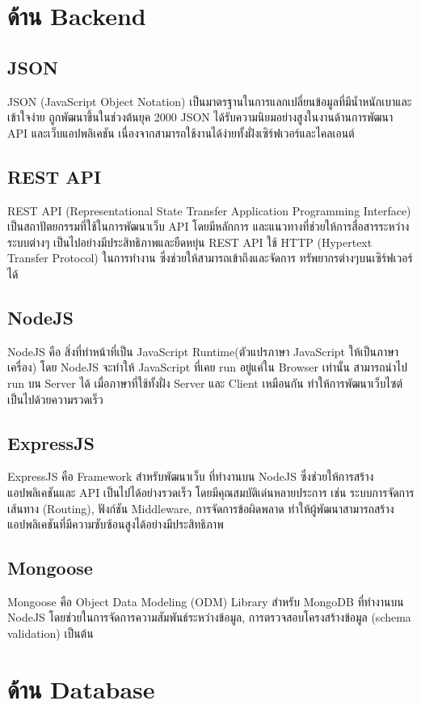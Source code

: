 \section{ด้าน Backend}
\subsection{JSON}
JSON (JavaScript Object Notation) เป็นมาตรฐานในการแลกเปลี่ยนข้อมูลที่มีน้ำหนักเบาและเข้าใจง่าย ถูกพัฒนาขึ้นในช่วงต้นยุค 2000
JSON ได้รับความนิยมอย่างสูงในงานด้านการพัฒนา API และเว็บแอปพลิเคชัน เนื่องจากสามารถใช้งานได้ง่ายทั้งฝั่งเซิร์ฟเวอร์และไคลเอนต์ \cite{json}
\subsection{REST API}
REST API (Representational State Transfer Application Programming Interface) เป็นสถาปัตยกรรมที่ใช้ในการพัฒนาเว็บ API โดยมีหลักการ
และแนวทางที่ช่วยให้การสื่อสารระหว่างระบบต่างๆ เป็นไปอย่างมีประสิทธิภาพและยืดหยุ่น REST API ใช้ HTTP (Hypertext Transfer Protocol) ในการทำงาน ซึ่งช่วยให้สามารถเข้าถึงและจัดการ
ทรัพยากรต่างๆบนเซิร์ฟเวอร์ได้ \cite{restapi} 
\subsection{NodeJS}
NodeJS คือ สิ่งที่ทำหน้าที่เป็น JavaScript Runtime(ตัวแปรภาษา JavaScript ให้เป็นภาษาเครื่อง) โดย NodeJS จะทำให้ JavaScript ที่เคย run อยู่แค่ใน Browser เท่านั้น สามารถนำไป run
บน Server ได้ เมื่อภาษาที่ใช้ทั้งฝั่ง Server และ Client เหมือนกัน ทำให้การพัฒนาเว็บไซต์เป็นไปด้วยความรวดเร็ว \cite{node1}\cite{node2}
\subsection{ExpressJS}
ExpressJS คือ Framework สำหรับพัฒนาเว็บ ที่ทำงานบน NodeJS ซึ่งช่วยให้การสร้างแอปพลิเคชันและ API เป็นไปได้อย่างรวดเร็ว โดยมีคุณสมบัติเด่นหลายประการ เช่น ระบบการจัดการเส้นทาง (Routing), 
ฟังก์ชัน Middleware, การจัดการข้อผิดพลาด ทำให้ผู้พัฒนาสามารถสร้างแอปพลิเคชันที่มีความซับซ้อนสูงได้อย่างมีประสิทธิภาพ \cite{express1}\cite{express2}
\subsection{Mongoose}
Mongoose คือ Object Data Modeling (ODM) Library สำหรับ MongoDB ที่ทำงานบน NodeJS โดยช่วยในการจัดการความสัมพันธ์ระหว่างข้อมูล, การตรวจสอบโครงสร้างข้อมูล (schema validation) เป็นต้น \cite{mongoose}
\section{ด้าน Database}
